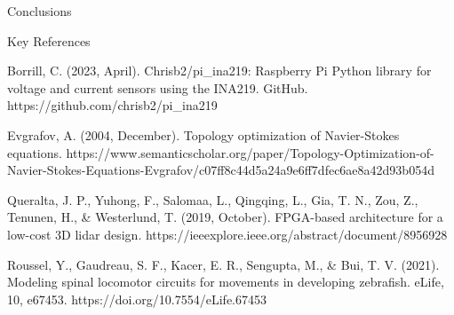 \documentclass[final, 16pt]{beamer}
\newlength{\colwidth}
\begin{document}
\begin{frame}[t]
\begin{columns}[t]
\begin{column}{\colwidth}
\begin{block}{Conclusions}
  \end{block}

  \begin{block}{Key References}

    \begin{hangparas}{.25in}{1}
      Borrill, C. (2023, April). Chrisb2/pi\_ina219: Raspberry Pi Python library for voltage and current sensors using the INA219. GitHub. https://github.com/chrisb2/pi\_ina219
    \end{hangparas}

    \begin{hangparas}{.25in}{1}
      Evgrafov, A. (2004, December). Topology optimization of Navier-Stokes equations. https://www.semanticscholar.org/paper/Topology-Optimization-of-Navier-Stokes-Equations-Evgrafov/c07ff8c44d5a24a9e6ff7dfec6ae8a42d93b054d 
    \end{hangparas}

    \begin{hangparas}{.25in}{1}
      Queralta, J. P., Yuhong, F., Salomaa, L., Qingqing, L., Gia, T. N., Zou, Z., Tenunen, H., \& Westerlund, T. (2019, October). FPGA-based architecture for a low-cost 3D lidar design. https://ieeexplore.ieee.org/abstract/document/8956928 
    \end{hangparas}

    \begin{hangparas}{.25in}{1}
      Roussel, Y., Gaudreau, S. F., Kacer, E. R., Sengupta, M., \& Bui, T. V. (2021). Modeling spinal locomotor circuits for movements in developing zebrafish. eLife, 10, e67453. https://doi.org/10.7554/eLife.67453
    \end{hangparas}

  \end{block}
\end{column}

\margincolumn
\end{columns}

\vspace*{6cm}
\end{frame}
\end{document}
